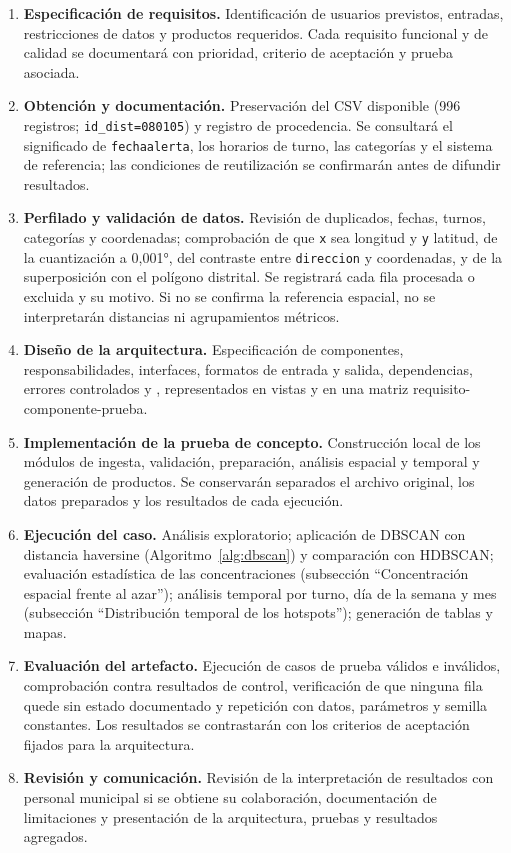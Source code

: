 \begin{enumerate}
  \item \textbf{Especificación de requisitos.} Identificación de usuarios previstos, entradas, restricciones de datos y productos requeridos. Cada requisito funcional y de calidad se documentará con prioridad, criterio de aceptación y prueba asociada.
  \item \textbf{Obtención y documentación.} Preservación del CSV disponible (996 registros; \texttt{id\_dist=080105}) y registro de procedencia. Se consultará el significado de \texttt{fechaalerta}, los horarios de turno, las categorías y el sistema de referencia; las condiciones de reutilización se confirmarán antes de difundir resultados.
  \item \textbf{Perfilado y validación de datos.} Revisión de duplicados, fechas, turnos, categorías y coordenadas; comprobación de que \texttt{x} sea longitud y \texttt{y} latitud, de la cuantización a 0,001°, del contraste entre \texttt{direccion} y coordenadas, y de la superposición con el polígono distrital. Se registrará cada fila procesada o excluida y su motivo. Si no se confirma la referencia espacial, no se interpretarán distancias ni agrupamientos métricos.
  \item \textbf{Diseño de la arquitectura.} Especificación de componentes, responsabilidades, interfaces, formatos de entrada y salida, dependencias, errores controlados y , representados en vistas y en una matriz requisito-componente-prueba.
  \item \textbf{Implementación de la prueba de concepto.} Construcción local de los módulos de ingesta, validación, preparación, análisis espacial y temporal y generación de productos. Se conservarán separados el archivo original, los datos preparados y los resultados de cada ejecución.
  \item \textbf{Ejecución del caso.} Análisis exploratorio; aplicación de DBSCAN con distancia haversine (Algoritmo~\ref{alg:dbscan}) y comparación con HDBSCAN; evaluación estadística de las concentraciones (subsección ``Concentración espacial frente al azar''); análisis temporal por turno, día de la semana y mes (subsección ``Distribución temporal de los hotspots''); generación de tablas y mapas.
  \item \textbf{Evaluación del artefacto.} Ejecución de casos de prueba válidos e inválidos, comprobación contra resultados de control, verificación de que ninguna fila quede sin estado documentado y repetición con datos, parámetros y semilla constantes. Los resultados se contrastarán con los criterios de aceptación fijados para la arquitectura.
  \item \textbf{Revisión y comunicación.} Revisión de la interpretación de resultados con personal municipal si se obtiene su colaboración, documentación de limitaciones y presentación de la arquitectura, pruebas y resultados agregados.
\end{enumerate}

